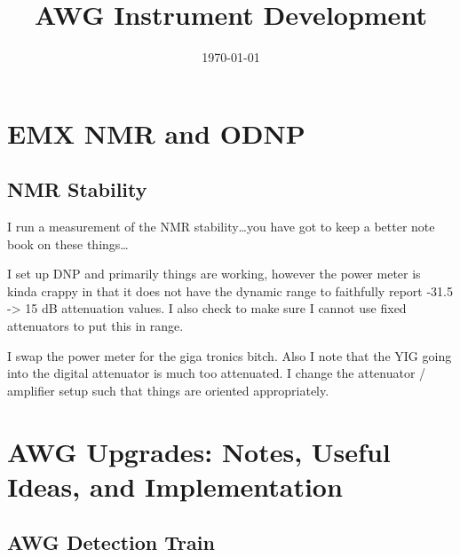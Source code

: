 \documentclass[10pt]{book}
\title{AWG Instrument Development}
\date{\today}
\begin{document}
\maketitle

\chapter{EMX NMR and ODNP}
\section{NMR Stability}
I run a measurement of the NMR stability\ldots you have got to keep a better note book on these things\ldots

I set up DNP and primarily things are working, however the power meter is kinda crappy in that it does not have the dynamic range to faithfully report -31.5 -> 15 dB attenuation values. I also check to make sure I cannot use fixed attenuators to put this in range.

I swap the power meter for the giga tronics bitch. Also I note that the YIG going into the digital attenuator is much too attenuated. I change the attenuator / amplifier setup such that things are oriented appropriately.


\chapter{AWG Upgrades: Notes, Useful Ideas, and Implementation}
\section{AWG Detection Train}
\end{document}
